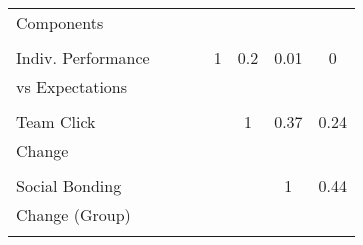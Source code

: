 \begin{table}[htbp]
{\begin{tabular}{lllccccc}
Components         & \multicolumn{1}{c}{}                 & \multicolumn{1}{c}{}                 &                      &                      &                      &                      &                      \\
                   &                                      &                                      & \multicolumn{1}{l}{} & \multicolumn{1}{l}{} & \multicolumn{1}{l}{} & \multicolumn{1}{l}{} & \multicolumn{1}{l}{} \\
Indiv. Performance &                                      &                                      &                      & 1                    & 0.2                  & 0.01                 & 0                    \\
vs Expectations    &                                      &                                      &                      &                      &                      &                      &                      \\
                   &                                      &                                      &                      &                      &                      &                      &                      \\
Team Click         &                                      &                                      &                      &                      & 1                    & 0.37                 & 0.24                 \\
Change             &                                      &                                      &                      &                      &                      &                      &                      \\
                   &                                      &                                      &                      &                      &                      &                      &                      \\
Social Bonding     &                                      &                                      &                      &                      &                      & 1                    & 0.44                 \\
Change (Group)     &                                      &                                      &                      &                      &                      &                      &                      \\
                   &                                      &                                      &                      &                      &                      &                      &                      \\

\end{tabular}}
\end{table}
